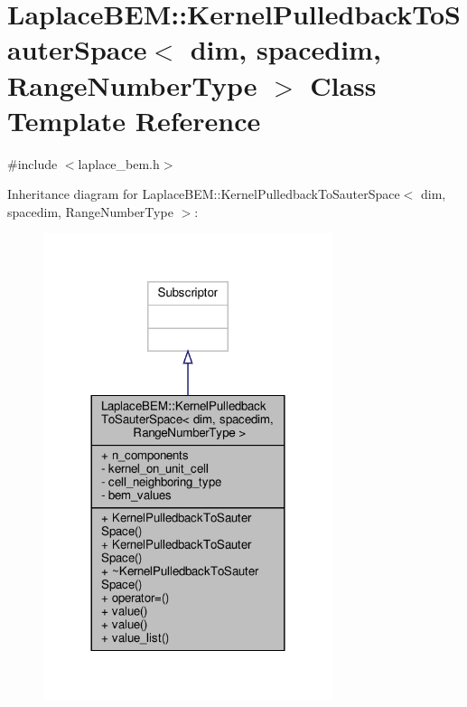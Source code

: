 \hypertarget{classLaplaceBEM_1_1KernelPulledbackToSauterSpace}{}\section{Laplace\+B\+EM\+:\+:Kernel\+Pulledback\+To\+Sauter\+Space$<$ dim, spacedim, Range\+Number\+Type $>$ Class Template Reference}
\label{classLaplaceBEM_1_1KernelPulledbackToSauterSpace}


{\ttfamily \#include $<$laplace\+\_\+bem.\+h$>$}



Inheritance diagram for Laplace\+B\+EM\+:\+:Kernel\+Pulledback\+To\+Sauter\+Space$<$ dim, spacedim, Range\+Number\+Type $>$\+:\nopagebreak
\begin{figure}[H]
\begin{center}
\leavevmode
\includegraphics[width=240pt]{classLaplaceBEM_1_1KernelPulledbackToSauterSpace__inherit__graph}
\end{center}
\end{figure}


